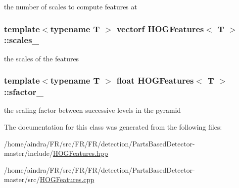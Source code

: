 the number of scales to compute features at 

\hypertarget{classHOGFeatures_a27490a8c33c7ffbfdeedafc5af0ad544}{
\subsubsection[{scales\-\_\-}]{\setlength{\rightskip}{0pt plus 5cm}template$<$typename T $>$ {\bf vectorf} {\bf \-H\-O\-G\-Features}$<$ \-T $>$\-::{\bf scales\-\_\-}}}\label{classHOGFeatures_a27490a8c33c7ffbfdeedafc5af0ad544}


the scales of the features 

\hypertarget{classHOGFeatures_a45b232ca94e93b4f30d342374e62578f}{
\subsubsection[{sfactor\-\_\-}]{\setlength{\rightskip}{0pt plus 5cm}template$<$typename T $>$ float {\bf \-H\-O\-G\-Features}$<$ \-T $>$\-::{\bf sfactor\-\_\-}}}\label{classHOGFeatures_a45b232ca94e93b4f30d342374e62578f}


the scaling factor between successive levels in the pyramid 



\-The documentation for this class was generated from the following files\-:\begin{DoxyCompactItemize}
\item 
/home/aindra/\-F\-R/src/\-F\-R/\-F\-R/detection/\-Parts\-Based\-Detector-\/master/include/\hyperlink{HOGFeatures_8hpp}{\-H\-O\-G\-Features.\-hpp}\item 
/home/aindra/\-F\-R/src/\-F\-R/\-F\-R/detection/\-Parts\-Based\-Detector-\/master/src/\hyperlink{HOGFeatures_8cpp}{\-H\-O\-G\-Features.\-cpp}\end{DoxyCompactItemize}
